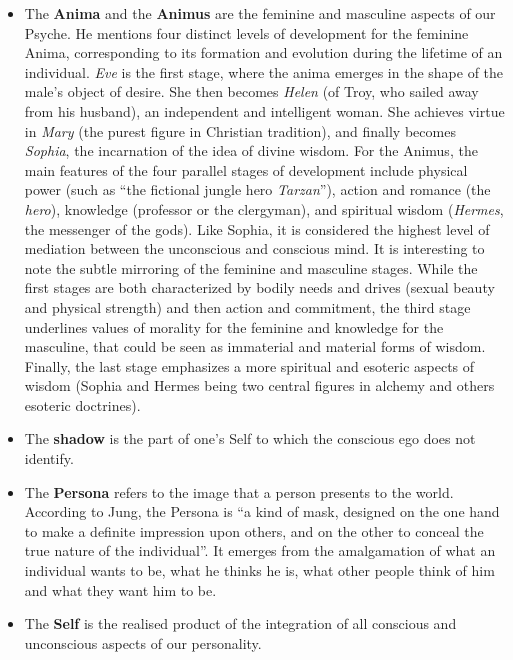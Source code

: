 \documentclass[
]{book}
\providecommand{\tightlist}{%
  \setlength{\itemsep}{0pt}\setlength{\parskip}{0pt}}
\begin{document}
\begin{itemize}
\tightlist
\item
  The \textbf{Anima} and the \textbf{Animus} are the feminine and masculine aspects of our Psyche. He mentions four distinct levels of development for the feminine Anima, corresponding to its formation and evolution during the lifetime of an individual. \emph{Eve} is the first stage, where the anima emerges in the shape of the male's object of desire. She then becomes \emph{Helen} (of Troy, who sailed away from his husband), an independent and intelligent woman. She achieves virtue in \emph{Mary} (the purest figure in Christian tradition), and finally becomes \emph{Sophia}, the incarnation of the idea of divine wisdom. For the Animus, the main features of the four parallel stages of development include physical power (such as ``the fictional jungle hero \emph{Tarzan}''), action and romance (the \emph{hero}), knowledge (professor or the clergyman), and spiritual wisdom (\emph{Hermes}, the messenger of the gods). Like Sophia, it is considered the highest level of mediation between the unconscious and conscious mind. It is interesting to note the subtle mirroring of the feminine and masculine stages. While the first stages are both characterized by bodily needs and drives (sexual beauty and physical strength) and then action and commitment, the third stage underlines values of morality for the feminine and knowledge for the masculine, that could be seen as immaterial and material forms of wisdom. Finally, the last stage emphasizes a more spiritual and esoteric aspects of wisdom (Sophia and Hermes being two central figures in alchemy and others esoteric doctrines).
\end{itemize}

\begin{itemize}
\tightlist
\item
  The \textbf{shadow} is the part of one's Self to which the conscious ego does not identify.
\item
  The \textbf{Persona} refers to the image that a person presents to the world. According to Jung, the Persona is ``a kind of mask, designed on the one hand to make a definite impression upon others, and on the other to conceal the true nature of the individual''. It emerges from the amalgamation of what an individual wants to be, what he thinks he is, what other people think of him and what they want him to be.
\item
  The \textbf{Self} is the realised product of the integration of all conscious and unconscious aspects of our personality.
\end{itemize}
\end{document}

